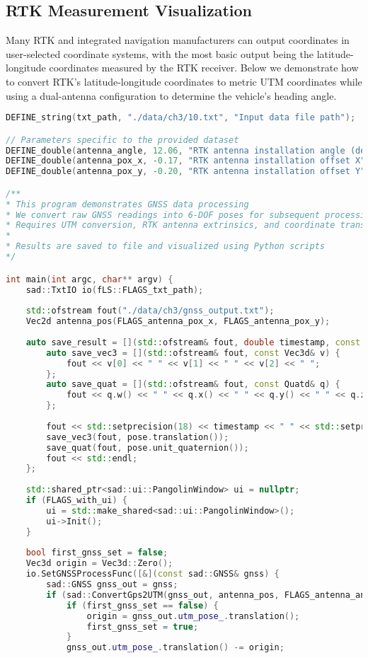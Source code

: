 \subsection{RTK Measurement Visualization}
Many RTK and integrated navigation manufacturers can output coordinates in user-selected coordinate systems, with the most basic output being the latitude-longitude coordinates measured by the RTK receiver. Below we demonstrate how to convert RTK's latitude-longitude coordinates to metric UTM coordinates while using a dual-antenna configuration to determine the vehicle's heading angle.

\begin{lstlisting}[language=c++,caption=ch3/process\_gnss.cc]
DEFINE_string(txt_path, "./data/ch3/10.txt", "Input data file path");

// Parameters specific to the provided dataset
DEFINE_double(antenna_angle, 12.06, "RTK antenna installation angle (degrees)");
DEFINE_double(antenna_pox_x, -0.17, "RTK antenna installation offset X");
DEFINE_double(antenna_pox_y, -0.20, "RTK antenna installation offset Y");

/**
* This program demonstrates GNSS data processing
* We convert raw GNSS readings into 6-DOF poses for subsequent processing
* Requires UTM conversion, RTK antenna extrinsics, and coordinate transformation
*
* Results are saved to file and visualized using Python scripts
*/

int main(int argc, char** argv) {
	sad::TxtIO io(fLS::FLAGS_txt_path);
	
	std::ofstream fout("./data/ch3/gnss_output.txt");
	Vec2d antenna_pos(FLAGS_antenna_pox_x, FLAGS_antenna_pox_y);
	
	auto save_result = [](std::ofstream& fout, double timestamp, const SE3& pose) {
		auto save_vec3 = [](std::ofstream& fout, const Vec3d& v) { 
			fout << v[0] << " " << v[1] << " " << v[2] << " "; 
		};
		auto save_quat = [](std::ofstream& fout, const Quatd& q) {
			fout << q.w() << " " << q.x() << " " << q.y() << " " << q.z() << " ";
		};
		
		fout << std::setprecision(18) << timestamp << " " << std::setprecision(9);
		save_vec3(fout, pose.translation());
		save_quat(fout, pose.unit_quaternion());
		fout << std::endl;
	};
	
	std::shared_ptr<sad::ui::PangolinWindow> ui = nullptr;
	if (FLAGS_with_ui) {
		ui = std::make_shared<sad::ui::PangolinWindow>();
		ui->Init();
	}
	
	bool first_gnss_set = false;
	Vec3d origin = Vec3d::Zero();
	io.SetGNSSProcessFunc([&](const sad::GNSS& gnss) {
		sad::GNSS gnss_out = gnss;
		if (sad::ConvertGps2UTM(gnss_out, antenna_pos, FLAGS_antenna_angle)) {
			if (first_gnss_set == false) {
				origin = gnss_out.utm_pose_.translation();
				first_gnss_set = true;
			}
			gnss_out.utm_pose_.translation() -= origin;
			

\end{lstlisting}
